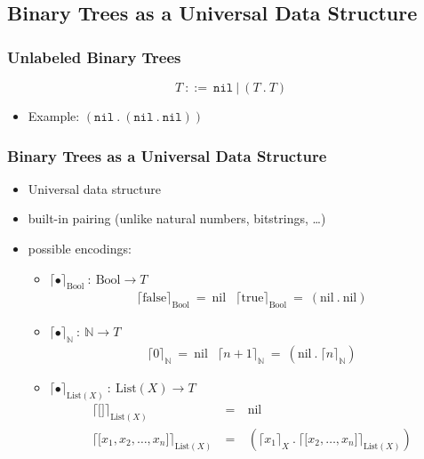 \documentclass{beamer}
\begin{document}
\subsection{Binary Trees as a Universal Data Structure}

\begin{frame}[fragile]
  \frametitle{Unlabeled Binary Trees}
	\[ 
	T ~::=~ \texttt{nil} ~|~ (T ~.~ T)
	\]
  \begin{itemize}
    \item Example: $(\texttt{nil} ~.~ (\texttt{nil} ~.~ \texttt{nil}))$
  \end{itemize}
  \vspace{0.5cm}    
\end{frame}

\begin{frame}
  \frametitle{Binary Trees as a Universal Data Structure}
  \begin{itemize}
    \item Universal data structure 
    \item built-in pairing (unlike natural numbers, bitstrings, \ldots)
    \item possible encodings:
    \begin{itemize}
	  \item $\lceil \bullet \rceil_{\text{Bool}} ~:~ \text{Bool} \rightarrow T$
	  \[
	    \begin{array}{cc}
	    \lceil \text{false} \rceil_{\text{Bool}} ~=~ \text{nil}
	    &
	    \lceil \text{true} \rceil_{\text{Bool}} ~=~ (\text{nil} ~.~ \text{nil})
	    \end{array}
	  \]
	  
	  \item $\lceil \bullet \rceil_{\mathbb{N}} ~:~ \mathbb{N} \rightarrow T$
	  \[
	    \begin{array}{cc}
	    \lceil 0 \rceil_{\mathbb{N}} ~=~ \text{nil}
	    &
	    \lceil n+1 \rceil_{\mathbb{N}} ~=~ (\text{nil} ~.~ \lceil n \rceil_{\mathbb{N}})
	    \end{array}
	  \]
	  
	  \item $\lceil \bullet \rceil_{\text{List}(X)} ~:~ \text{List}(X) \rightarrow T$
	  \[
	    \begin{array}{lcl}
	    \lceil \lbrack\rbrack \rceil_{\text{List}(X)} & ~=~ & \text{nil}
	    \\
	    \lceil \lbrack x_1, x_2, \ldots, x_n \rbrack \rceil_{\text{List}(X)} 
	      & ~=~ & (\lceil x_1 \rceil_{X} ~.~ \lceil \lbrack x_2, \ldots, x_n \rbrack \rceil_{\text{List}(X)})
	    \end{array}
	  \]
    \end{itemize}
  \end{itemize}
\end{frame}
\end{document}
